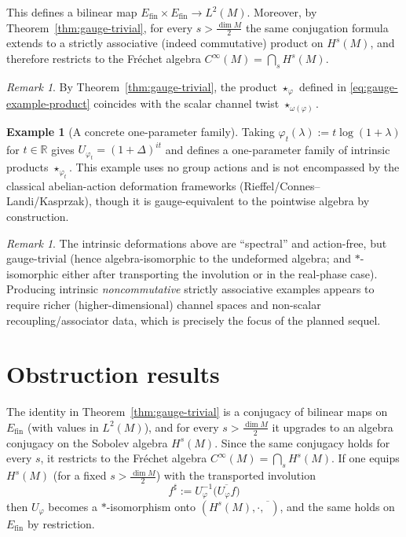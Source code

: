 \documentclass[11pt]{amsart}
\theoremstyle{plain}
\theoremstyle{definition}
\newtheorem{example}[theorem]{Example}
\theoremstyle{remark}
\newtheorem{remark}[theorem]{Remark}
\newcommand{\bbR}{\mathbb{R}}
\begin{document}
This defines a bilinear map $E_{\mathrm{fin}}\times E_{\mathrm{fin}}\to L^2(M)$.
Moreover, by Theorem~\ref{thm:gauge-trivial}, for every $s>\frac{\dim M}{2}$ the same conjugation formula
extends to a strictly associative (indeed commutative) product on $H^s(M)$, and therefore restricts to the Fr\'echet algebra $C^\infty(M)=\bigcap_s H^s(M)$.

\begin{remark}
By Theorem~\ref{thm:gauge-trivial}, the product $\star_\varphi$ defined in \eqref{eq:gauge-example-product}
coincides with the scalar channel twist $\star_{\omega(\varphi)}$.
\end{remark}

\begin{example}[A concrete one-parameter family]\label{ex:gauge-parameter}
Taking $\varphi_t(\lambda):=t\log(1+\lambda)$ for $t\in\bbR$ gives $U_{\varphi_t}=(1+\Delta)^{it}$
and defines a one-parameter family of intrinsic products $\star_{\varphi_t}$.
This example uses no group actions and is not encompassed by the classical abelian-action deformation frameworks
(Rieffel/Connes--Landi/Kasprzak), though it is gauge-equivalent to the pointwise algebra by construction.
\end{example}

\begin{remark}
The intrinsic deformations above are ``spectral'' and action-free, but gauge-trivial (hence algebra-isomorphic to the undeformed algebra; and $\ast$-isomorphic either after transporting the involution or in the real-phase case).
Producing intrinsic \emph{noncommutative} strictly associative examples appears to require richer (higher-dimensional) channel spaces
and non-scalar recoupling/associator data, which is precisely the focus of the planned sequel.
\end{remark}

\section{Obstruction results}\label{sec:obstruction}

The identity in Theorem~\ref{thm:gauge-trivial} is a conjugacy of bilinear maps on $E_{\mathrm{fin}}$
(with values in $L^2(M)$), and for every $s>\frac{\dim M}{2}$ it upgrades to an algebra conjugacy on the Sobolev algebra $H^s(M)$. Since the same conjugacy holds for every $s$,
it restricts to the Fr\'echet algebra $C^\infty(M)=\bigcap_s H^s(M)$. If one equips $H^s(M)$ (for a fixed $s>\frac{\dim M}{2}$) with the transported involution 
\begin{equation}\label{eq:star_transport}
f^{\sharp}:=U_\varphi^{-1}\big(\overline{U_\varphi f}\big)    
\end{equation}
then $U_\varphi$ becomes a $*$-isomorphism onto $(H^s(M),\cdot, \overline{\phantom{f}})$,
and the same holds on $E_{\mathrm{fin}}$ by restriction.
\end{document}
